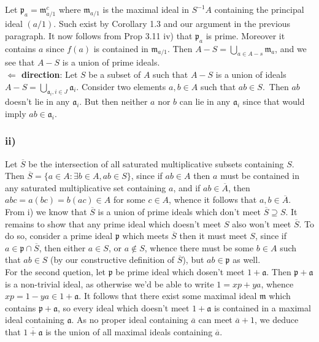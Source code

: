 \documentclass{article}
\theoremstyle{definition}
\begin{document}
Let $\mathfrak{p}_{a} = \mathfrak{m}_{a/1}^{c}$ where $\mathfrak{m}_{a/1}$ is
the maximal ideal in $S^{-1}A$ containing the principal ideal $(a/1)$. Such 
exist by Corollary 1.3 and our argument in the previous paragraph. It
now follows from Prop 3.11 iv) that $\mathfrak{p}_{a}$ is prime. Moreover it
contains $a$ since $f(a)$ is contained in $\mathfrak{m}_{a/1}$. Then $A - S =
\bigcup_{a \in A - s} \mathfrak{m}_a$, and we see that $A - S$ is a union of
prime ideals. \\

\textbf{$\Leftarrow$ direction}:
Let $S$ be a subset of $A$ such that $A - S$ is a union of  ideals $A - S
= \bigcup_{\mathfrak{a}_{i}, i \in J} \mathfrak{a}_{i}$. Consider two elements $a,
b \in A$ such that $ab \in S$. Then $ab$ doesn't lie in any $\mathfrak{a}_{i}$.
But then neither $a$ nor $b$ can lie in any $\mathfrak{a}_{i}$ since that would
imply $ab \in \mathfrak{a}_{i}$.

\subsubsection*{ii)}
Let $\overline{S}$ be the intersection of all saturated multiplicative subsets
containing $S$. Then $\overline{S} = \{a \in A : \exists b \in A, ab \in S \}$,
since if $ab \in A$ then $a$ must be contained in any saturated multiplicative
set containing $a$, and if $ab \in \overline{A}$, then $abc = a(bc) = b(ac) \in
A$ for some $c \in A$, whence it follows that $a, b \in \overline{A}$. \\

From i) we know that $\overline{S}$ is a union of prime ideals which don't meet
$\overline{S} \supseteq S$. It remains to show that any prime ideal which
doesn't meet $S$ also won't meet $\overline{S}$. To do so, consider a prime
ideal $\mathfrak{p}$ which meets $\overline{S}$ then it must meet $S$, since if
$a \in \mathfrak{p} \cap \overline{S}$, then either $a \in S$, or $a \not \in
S$, whence there must be some $b \in A$ such that $ab \in S$ (by our
constructive definition of $\overline{S}$), but $ab \in \mathfrak{p}$ as well. \\

For the second quetion, let $\mathfrak{p}$ be prime ideal which dosen't meet $1
+ \mathfrak{a}$. Then $\mathfrak{p} + \mathfrak{a}$ is a non-trivial ideal, as
otherwise we'd be able to write $1 = xp + ya$, whence $xp = 1 - ya \in 1 +
\mathfrak{a}$. It follows that there exist some maximal ideal $\mathfrak{m}$
which contains $\mathfrak{p} + \mathfrak{a}$, so every ideal which doesn't meet
$1 + \mathfrak{a}$ is contained in a maximal ideal containing $\mathfrak{a}$.
As no proper ideal containing $\overline{a}$ can meet $\overline{a} + 1$, we
deduce that $\overline{1 + \mathfrak{a}}$ is the union of all maximal ideals
containing $\overline{a}$.
\end{document}
